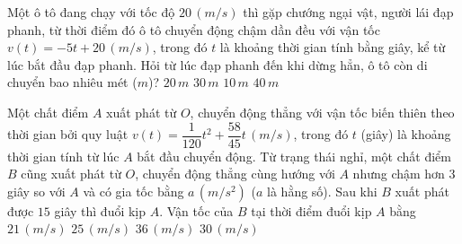 \begin{ex}%
    Một ô tô đang chạy với tốc độ $20\,\left(m/s \right)$ thì gặp chướng ngại vật, người lái đạp phanh, từ thời điểm đó ô tô chuyển động chậm dần đều với vận tốc $v\left(t \right)=-5t+20\,\left(m/s \right)$, trong đó $t$ là khoảng thời gian tính bằng giây, kể từ lúc bắt đầu đạp phanh. Hỏi từ lúc đạp phanh đến khi dừng hẳn, ô tô còn di chuyển bao nhiêu mét ($m$)?
    \choice
    {$20\,m$}
    {$30\,m$}
    {$10\,m$}
    {\True $40\,m$}
\end{ex}

\begin{ex}%
    Một chất điểm $A$ xuất phát từ $O$, chuyển động thẳng với vận tốc biến thiên theo thời gian bởi quy luật $v\left(t \right)=\dfrac{1}{120}t^2+\dfrac{58}{45}t\,\left(m/s \right)$, trong đó $t$ (giây) là khoảng thời gian tính từ lúc $A$ bắt đầu chuyển động. Từ trạng thái nghỉ, một chất điểm $B$ cũng xuất phát từ $O$, chuyển động thẳng cùng hướng với $A$ nhưng chậm hơn $3$ giây so với $A$ và có gia tốc bằng $a\,\left(m/s^2 \right)$ ($a$ là hằng số). Sau khi $B$ xuất phát được $15$ giây thì đuổi kịp $A$. Vận tốc của $B$ tại thời điểm đuổi kịp $A$ bằng
    \choice
    {$21\,\left(m/s \right)$}
    {$25\,\left(m/s \right)$}
    {$36\,\left(m/s \right)$}
    {\True $30\,\left(m/s \right)$}
\end{ex}

